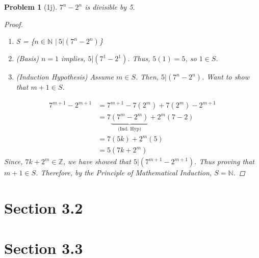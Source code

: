 \documentclass{article}
\theoremstyle{problem}
\newtheorem{prob}{Problem}
\begin{document}
  \begin{prob}[1j]
    $7^n - 2^n$ is divisible by 5.
    \begin{proof}\  
      \begin{enumerate}
      \item S = \{$n \in \mathbb{N}$ $|\ 5 | (7^n - 2^n)$\}
      \item (Basis) $n = 1$ implies, $5 | (7^1 - 2^1)$. Thus, $5(1) = 5$, so $1 \in S$.
      \item (Induction Hypothesis) Assume $m \in S$. Then, $5 | (7^n - 2^n)$. Want to show that $m + 1 \in S$.
      \end{enumerate}
      \begin{align*}
        7^{m+1} - 2^{m+1} &= 7^{m+1} -7(2^m) + 7(2^m) - 2^{m+1}\\
        &= 7\underbrace{(7^m - 2^m)}_{\text{(Ind. Hyp)}} + 2^m(7 - 2)\\
        &= 7(5k) + 2^m(5)\\
        &= 5(7k + 2^m)
      \end{align*}
      Since, $7k + 2^m \in \mathbb{Z}$, we have showed that $5 | (7^{m+1} - 2^{m+1})$. Thus proving that $m + 1 \in S$. Therefore, by the Principle of Mathematical Induction, $S = \mathbb{N}$.
    \end{proof}
  \end{prob}
 
  \section*{Section 3.2}

\section*{Section 3.3}
\end{document}
